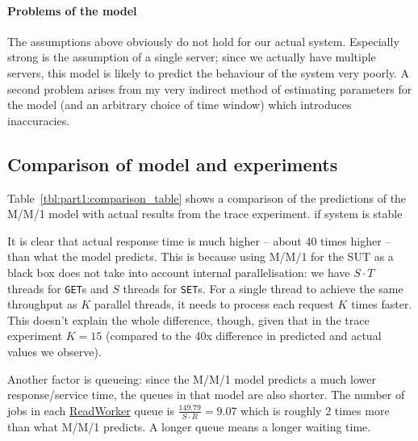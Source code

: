 \documentclass[11pt]{article}
\newcommand{\get}[0]{\texttt{GET}}
\newcommand{\set}[0]{\texttt{SET}}
\newcommand{\todo}[1]{\fcolorbox{black}{Apricot}{TODO: #1}}
\newcommand{\linkmain}[1]{\href{https://gitlab.inf.ethz.ch/pungast/asl-fall16-project/blob/master/src/main/java/asl/#1.java}{#1}}
\begin{document}

\paragraph{Problems of the model}
The assumptions above obviously do not hold for our actual system. Especially strong is the assumption of a single server; since we actually have multiple servers, this model is likely to predict the behaviour of the system very poorly. A second problem arises from my very indirect method of estimating parameters for the model (and an arbitrary choice of time window) which introduces inaccuracies.

\subsection{Comparison of model and experiments}




Table~\ref{tbl:part1:comparison_table} shows a comparison of the predictions of the M/M/1 model with actual results from the trace experiment. \todo{mention} if system is stable

It is clear that actual response time is much higher -- about 40 times higher -- than what the model predicts. This is because using M/M/1 for the SUT as a black box does not take into account internal parallelisation: we have $S \cdot T$ threads for \get{}s and $S$ threads for \set{}s. For a single thread to achieve the same throughput as $K$ parallel threads, it needs to process each request $K$ times faster. This doesn't explain the whole difference, though, given that in the trace experiment $K=15$ (compared to the 40x difference in predicted and actual values we observe).

Another factor is queueing: since the M/M/1 model predicts a much lower response/service time, the queues in that model are also shorter. The number of jobs in each \linkmain{ReadWorker} queue is $\frac{149.79}{S \cdot R} = 9.07$ which is roughly 2 times more than what M/M/1 predicts. A longer queue means a longer waiting time.
\end{document}
